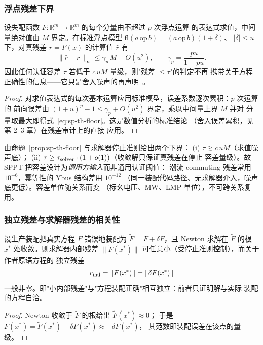 \subsubsection{浮点残差下界}
\begin{proposition}[残差的浮点下界]\label{prop:sp-th-floor}
设失配函数 $F:\mathbb R^m\to\mathbb R^m$ 的每个分量由不超过 $p$ 次浮点运算
的表达式求值，中间量绝对值由 $M$ 界定。在标准浮点模型
$\mathrm{fl}(a\,\mathrm{op}\,b)=(a\,\mathrm{op}\,b)(1+\delta)$、
$|\delta|\le u$ 下，对真残差 $r=F(x)$ 的计算值 $\widehat r$ 有
\begin{equation}
\|\widehat r-r\|_\infty\le\gamma_p\,M+O(u^2),
\qquad \gamma_p=\frac{pu}{1-pu}.
\label{eq:sp-th-floor}
\end{equation}
因此任何认证容差 $\tau$ 若低于 $c\,uM$ 量级，则"残差 $\le\tau$"的判定不再
携带关于方程正确性的信息——它只是舍入噪声的再声明~\cite{spth:higham02}。
\end{proposition}
\begin{proof}
对求值表达式的每次基本运算应用标准模型，误差系数逐次累积：$p$ 次运算的
前向误差由 $(1+u)^p-1\le\gamma_p+O(u^2)$ 界定，乘以中间量上界 $M$ 并对
分量取最大即得式~\eqref{eq:sp-th-floor}。这是数值分析的标准结论
（舍入误差累积，见~\cite{spth:higham02} 第 2--3 章）在残差审计上的直接
应用。
\end{proof}

\begin{remark}[容差选取的操作口径]
由命题~\ref{prop:sp-th-floor} 与求解器停止准则给出两个下界：
(i) $\tau\gtrsim c\,uM$（求值噪声底）；
(ii) $\tau\ge\tau_{\rm solver}\cdot(1+o(1))$（收敛解只保证真残差在停止
容差量级）。故 SPPT 把容差设计为\emph{调用方输入}而非通用认证阈值：
潮流 commuting 残差常用 $10^{-6}$，幂等性的 Ybus 结构差用 $10^{-12}$
（同一装配代码路径、无求解器介入，噪声底更低）。容差单位随关系而变
（标幺电压、MW、LMP 单位），不可跨关系复用。
\end{remark}

\subsubsection{独立残差与求解器残差的相关性}
\begin{proposition}[自洽盲区的存在]\label{prop:sp-th-selfconsistent}
设生产装配把真实方程 $F$ 错误地装配为 $\widetilde F=F+\delta F$，且 Newton
求解在 $\widetilde F$ 的根 $x^*$ 处收敛。则求解器内部残差
$\|\widetilde F(x^*)\|$ 可任意小（受停止准则控制），而关于作者原语方程的
独立残差
\begin{equation}
r_{\rm ind}=\|F(x^*)\|=\|\delta F(x^*)\|
\end{equation}
一般非零。即"小内部残差"与"方程装配正确"相互独立：前者只证明解与实际
装配的方程自洽。
\end{proposition}
\begin{proof}
Newton 收敛于 $\widetilde F$ 的根给出 $\widetilde F(x^*)\approx0$；
于是 $F(x^*)=\widetilde F(x^*)-\delta F(x^*)\approx-\delta F(x^*)$，
其范数即装配误差在该点的量级。
\end{proof}

